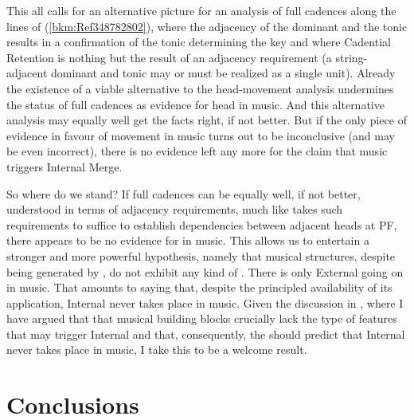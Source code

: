 \documentclass[output=paper]{langsci/langscibook}
\begin{document}
This all calls for an alternative picture for an analysis of full cadences
along the lines of (\ref{bkm:Ref348782802}), where the adjacency of the
dominant and the tonic results in a confirmation of the tonic determining the
key and where Cadential Retention is nothing but the result of an adjacency
requirement (a string-adjacent dominant and tonic may or must be realized as a
single unit). Already the existence of a viable alternative to the
head-movement analysis undermines the status of full cadences as evidence for
head  in music. And this alternative analysis may equally well get the
facts right, if not better. But if the only piece of evidence in favour of
movement in music turns out to be inconclusive (and may be even incorrect),
there is no evidence left any more for the claim that music triggers Internal
Merge.

So where do we stand? If full cadences can be equally well, if not better,
understood in terms of adjacency requirements, much like \citet{Bobaljik1995}
takes such requirements to suffice to establish dependencies between adjacent
heads at \gls{PF}, there appears to be no evidence for  in music. This
allows us to entertain a stronger and more powerful hypothesis, namely that
musical structures, despite being generated by , do not exhibit any
kind of . There is only External  going on in music. That
amounts to saying that, despite the principled availability of its application,
Internal  never takes place in music. Given the discussion in
, where I have argued that that musical building blocks
crucially lack the type of features that may trigger Internal  and
that, consequently, the  should
predict that Internal  never takes place in music, I take this to be
a welcome result.

\section{Conclusions}\label{sec:key:26.5}
\end{document}
